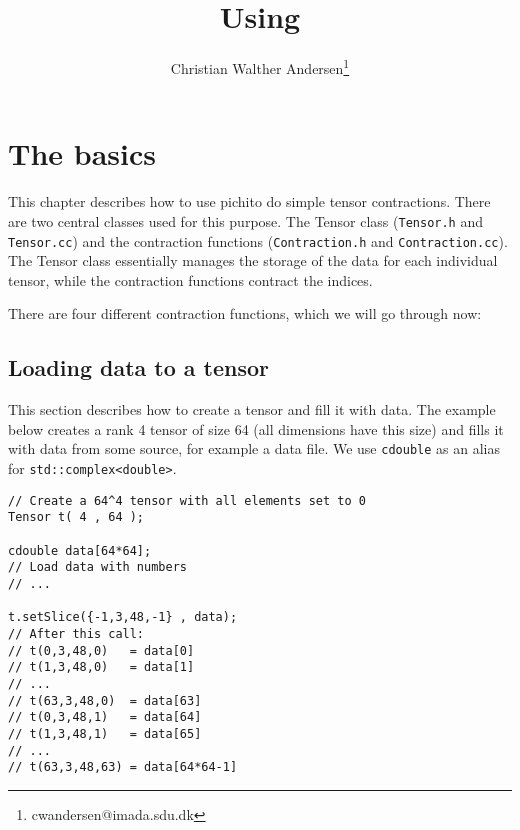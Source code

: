 \documentclass[paper=a4, oneside]{memoir}
\title{Using \packagename}
\author{Christian Walther Andersen\thanks{cwandersen@imada.sdu.dk}}
\newcommand{\packagename}{pichi}
\begin{document}

\lstset{style=cc++}

\maketitle %


\chapter{The basics}

This chapter describes how to use \packagename to do simple tensor 
contractions. There are two central classes used for this purpose. The Tensor 
class (\texttt{Tensor.h} and \texttt{Tensor.cc}) and the contraction functions 
(\texttt{Contraction.h} and \texttt{Contraction.cc}). The Tensor class 
essentially manages the storage of the data for each individual tensor, while 
the contraction functions contract the indices.

There are four different contraction functions, which we will go through now:

\section*{Loading data to a tensor}

This section describes how to create a tensor and fill it with data. The 
example below creates a rank 4 tensor of size 64 (all dimensions have this 
size) and fills it with data from some source, for example a data 
file. We use \texttt{cdouble} as an alias for \texttt{std::complex<double>}.

\begin{lstlisting}
// Create a 64^4 tensor with all elements set to 0
Tensor t( 4 , 64 );

cdouble data[64*64];
// Load data with numbers
// ...

t.setSlice({-1,3,48,-1} , data); 
// After this call:
// t(0,3,48,0)   = data[0]
// t(1,3,48,0)   = data[1]
// ...
// t(63,3,48,0)  = data[63]
// t(0,3,48,1)   = data[64]
// t(1,3,48,1)   = data[65]
// ...
// t(63,3,48,63) = data[64*64-1]
\end{lstlisting}
\end{document}
